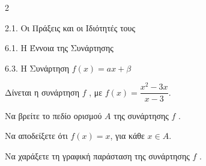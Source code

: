 \begin{ylh}{2}
    \item 2.1. Οι Πράξεις και οι Ιδιότητές τους
    \item 6.1. Η Έννοια της Συνάρτησης
    \item 6.3. Η Συνάρτηση $f(x)=ax+\beta$
\end{ylh}
Δίνεται η συνάρτηση $f$ , με $f(x) = \dfrac{x^2-3x}{x-3}$.
\begin{alist}
\item Να βρείτε το πεδίο ορισμού $A$ της συνάρτησης $f$ .
\item Να αποδείξετε ότι $f(x) = x$, για κάθε $x \in A$.
\item Να χαράξετε τη γραφική παράσταση της συνάρτησης $f$ .
\end{alist}

